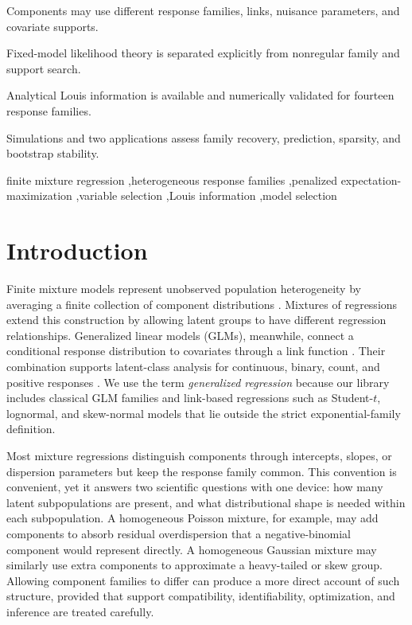 \documentclass[a4paper,fleqn]{cas-sc}
\begin{document}
\begin{highlights}
\item Components may use different response families, links, nuisance parameters, and covariate supports.
\item Fixed-model likelihood theory is separated explicitly from nonregular family and support search.
\item Analytical Louis information is available and numerically validated for fourteen response families.
\item Simulations and two applications assess family recovery, prediction, sparsity, and bootstrap stability.
\end{highlights}

\begin{keywords}
finite mixture regression \sep heterogeneous response families \sep penalized expectation-maximization \sep variable selection \sep Louis information \sep model selection
\end{keywords}

\maketitle

\section{Introduction}
\label{sec:introduction}

Finite mixture models represent unobserved population heterogeneity by averaging a finite collection of component distributions \citep{mclachlan2000finite,mclachlan2019review}. Mixtures of regressions extend this construction by allowing latent groups to have different regression relationships. Generalized linear models (GLMs), meanwhile, connect a conditional response distribution to covariates through a link function \citep{nelder1972glm,mccullagh1989glm}. Their combination supports latent-class analysis for continuous, binary, count, and positive responses \citep{wedel1995mixture,leisch2004flexmix,grun2007fitting}. We use the term \emph{generalized regression} because our library includes classical GLM families and link-based regressions such as Student-$t$, lognormal, and skew-normal models that lie outside the strict exponential-family definition.

Most mixture regressions distinguish components through intercepts, slopes, or dispersion parameters but keep the response family common. This convention is convenient, yet it answers two scientific questions with one device: how many latent subpopulations are present, and what distributional shape is needed within each subpopulation. A homogeneous Poisson mixture, for example, may add components to absorb residual overdispersion that a negative-binomial component would represent directly. A homogeneous Gaussian mixture may similarly use extra components to approximate a heavy-tailed or skew group. Allowing component families to differ can produce a more direct account of such structure, provided that support compatibility, identifiability, optimization, and inference are treated carefully.
\end{document}
